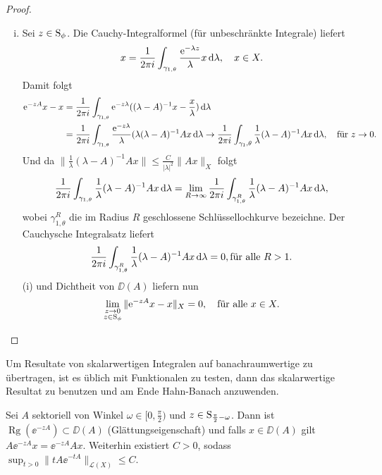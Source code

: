 \begin{proof}
\begin{enumerate}[(i)]
    \item Sei $z \in \mathrm{S}_\phi$.
      Die Cauchy-Integralformel (für unbeschränkte Integrale) liefert 
      $$
      x = \frac{1}{2\pi i} \int_{\gamma_{1,\theta}} \frac{\mathrm{e}^{-\lambda z}}{\lambda} x \, {\operatorname{d}\!{\lambda}}, \quad x \in X.
      $$
      Damit folgt 
      \begin{align*}
        \mathrm{e}^{-zA} x - x
        &= \frac{1}{2\pi i} \int_{\gamma_{1,\theta}} \mathrm{e}^{-z\lambda}((\lambda - A)^{-1} x - \frac{x}{\lambda}) \, {\operatorname{d}\!{\lambda}} \\
        &= \frac{1}{2\pi i} \int_{\gamma_{1,\theta}} \frac{\mathrm{e}^{-z\lambda}}{\lambda}(\lambda(\lambda - A)^{-1}A x \, {\operatorname{d}\!{\lambda}} 
        \to \frac{1}{2 \pi i} \int_{\gamma_1, \theta} \frac{1}{\lambda} (\lambda - A)^{-1} A x \, {\operatorname{d}\!{\lambda}}, \quad\text{für } z \to 0.
      \end{align*}
      Und da $\|\frac{1}{\lambda} (\lambda - A)^{-1} A x \| \leq \frac{C}{|\lambda|^2} \|A x \|_X$ folgt
      $$
      \frac{1}{2\pi i} \int_{\gamma_{1, \theta}} \frac{1}{\lambda} (\lambda - A)^{-1} A x\, {\operatorname{d}\!{\lambda}} = \lim_{R \to \infty} \frac{1}{2 \pi i} \int_{\gamma_{1,\theta}^R} \frac{1}{\lambda} (\lambda - A)^{-1} A x \, {\operatorname{d}\!{\lambda}},
      $$
      wobei $\gamma_{1,\theta}^R$ die im Radius $R$ geschlossene Schlüssellochkurve bezeichne.
      Der Cauchysche Integralsatz liefert
      $$
      \frac{1}{2\pi i} \int_{\gamma_{1,\theta}^R} \frac{1}{\lambda} (\lambda - A)^{-1} A x \, {\operatorname{d}\!{\lambda}} = 0, \text{für alle }  R > 1.
      $$
      (i) und Dichtheit von $\DD(A)$ liefern nun
      $$
      \lim_{\substack{z \to 0\\ z \in \mathrm{S}_\phi}} \| \mathrm{e}^{-zA}x - x\|_X = 0, \quad\text{für alle } x \in X. 
      $$
    \qedhere
  \end{enumerate}
\end{proof}

\begin{rem}
  Um Resultate von skalarwertigen Integralen auf banachraumwertige zu übertragen, ist es üblich mit Funktionalen zu testen, dann das skalarwertige Resultat zu benutzen und am Ende Hahn-Banach anzuwenden.
\end{rem}

\begin{thm}
  Sei $A$ sektoriell von Winkel $\omega \in [0,\frac{\pi}{2})$ und $z \in \mathrm{S}_{\frac{\pi}{2} - \omega}$.
    Dann ist $\operatorname{Rg}(\ee^{-zA}) \subset \DD(A)$ (Glättungseigenschaft) und falls $x \in \DD(A)$ gilt $A \ee^{-zA} x = \ee^{-z A} A x$.
    Weiterhin existiert $C > 0$, sodass $\sup_{t > 0} \|t A \ee^{-t A} \|_{\mathcal{L}(X)} \leq C$.
\end{thm}

